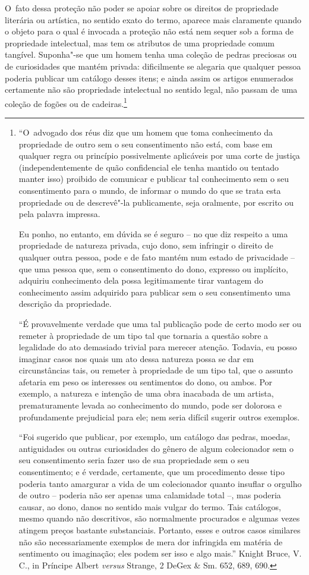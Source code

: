 O~fato dessa proteção não poder se apoiar sobre os direitos de
propriedade literária ou artística, no sentido exato do termo, aparece
mais claramente quando o objeto para o qual é invocada a proteção não
está nem sequer sob a forma de propriedade intelectual, mas tem os
atributos de uma propriedade comum tangível. Suponha"-se que um homem
tenha uma coleção de pedras preciosas ou de curiosidades que mantém
privada: dificilmente se alegaria que qualquer pessoa poderia publicar
um catálogo desses itens; e ainda assim os artigos enumerados certamente
não são propriedade intelectual no sentido legal, não passam de uma
coleção de fogões ou de cadeiras.\footnote{``O~advogado dos réus diz que
  um homem que toma conhecimento da propriedade de outro sem o seu
  consentimento não está, com base em qualquer regra ou princípio
  possivelmente aplicáveis por uma corte de justiça (independentemente
  de quão confidencial ele tenha mantido ou tentado manter isso)
  proibido de comunicar e publicar tal conhecimento sem o seu
  consentimento para o mundo, de informar o mundo do que se trata esta
  propriedade ou de descrevê"-la publicamente, seja oralmente, por
  escrito ou pela palavra impressa.

  Eu ponho, no entanto, em dúvida se é seguro -- no que diz respeito a
  uma propriedade de natureza privada, cujo dono, sem infringir o
  direito de qualquer outra pessoa, pode e de fato mantém num estado de
  privacidade -- que uma pessoa que, sem o consentimento do dono,
  expresso ou implícito, adquiriu conhecimento dela possa legitimamente
  tirar vantagem do conhecimento assim adquirido para publicar sem o seu
  consentimento uma descrição da propriedade.

  ``É provavelmente verdade que uma tal publicação pode de certo modo
  ser ou remeter à propriedade de um tipo tal que tornaria a questão
  sobre a legalidade do ato demasiado trivial para merecer atenção.
  Todavia, eu posso imaginar casos nos quais um ato dessa natureza possa
  se dar em circunstâncias tais, ou remeter à propriedade de um tipo
  tal, que o assunto afetaria em peso os interesses ou sentimentos do
  dono, ou ambos. Por exemplo, a natureza e intenção de uma obra
  inacabada de um artista, prematuramente levada ao conhecimento do
  mundo, pode ser dolorosa e profundamente prejudicial para ele; nem
  seria difícil sugerir outros exemplos.

  ``Foi sugerido que publicar, por exemplo, um catálogo das pedras,
  moedas, antiguidades ou outras curiosidades do gênero de algum
  colecionador sem o seu consentimento seria fazer uso de sua
  propriedade sem o seu consentimento; e é verdade, certamente, que um
  procedimento desse tipo poderia tanto amargurar a vida de um
  colecionador quanto insuflar o orgulho de outro -- poderia não ser
  apenas uma calamidade total --, mas poderia causar, ao dono, danos no
  sentido mais vulgar do termo. Tais catálogos, mesmo quando não
  descritivos, são normalmente procurados e algumas vezes atingem preços
  bastante substanciais. Portanto, esses e outros casos similares não
  são necessariamente exemplos de mera dor infringida em matéria de
  sentimento ou imaginação; eles podem ser isso e algo mais.'' Knight
  Bruce, V. C., in Príncipe Albert \emph{versus} Strange, 2 DeGex \& Sm.
  652, 689, 690.}

